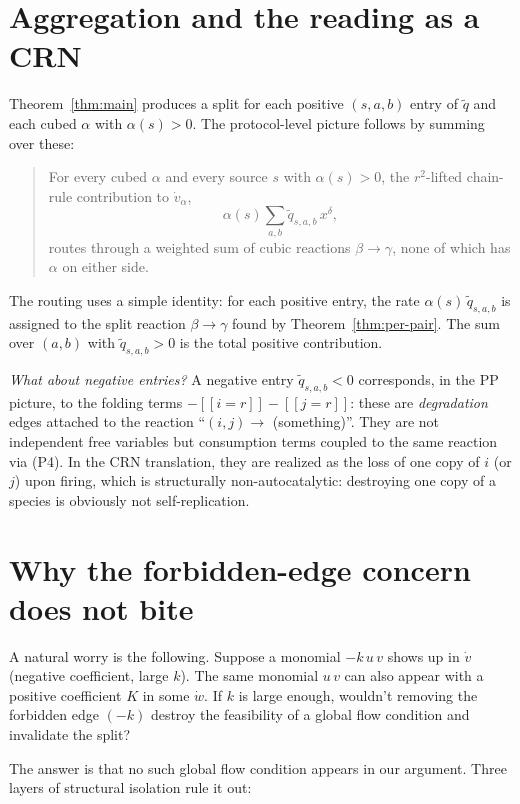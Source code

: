 \documentclass[11pt]{article}
\newcommand{\iv}[1]{[\![#1]\!]}
\begin{document}
\section{Aggregation and the reading as a CRN}

Theorem~\ref{thm:main} produces a split for each positive $(s,a,b)$
entry of $\widetilde q$ and each cubed $\alpha$ with $\alpha(s) > 0$.
The protocol-level picture follows by summing over these:

\begin{quote}
For every cubed $\alpha$ and every source $s$ with $\alpha(s) > 0$,
the $r^2$-lifted chain-rule contribution to $\dot v_\alpha$,
\[
   \alpha(s) \sum_{a,b} \widetilde q_{s,a,b}\, x^\delta,
\]
routes through a weighted sum of cubic reactions $\beta \to \gamma$,
none of which has $\alpha$ on either side.
\end{quote}

The routing uses a simple identity: for each positive entry, the rate
$\alpha(s)\,\widetilde q_{s,a,b}$ is assigned to the split reaction
$\beta \to \gamma$ found by Theorem~\ref{thm:per-pair}. The sum over
$(a,b)$ with $\widetilde q_{s,a,b} > 0$ is the total positive
contribution.

\emph{What about negative entries?} A negative entry
$\widetilde q_{s,a,b} < 0$ corresponds, in the PP picture, to the
folding terms $-\iv{i=r} - \iv{j=r}$: these are \emph{degradation}
edges attached to the reaction ``$(i,j) \to$ (something)''. They are not
independent free variables but consumption terms coupled to the same
reaction via (P4). In the CRN translation, they are realized as the
loss of one copy of $i$ (or $j$) upon firing, which is structurally
non-autocatalytic: destroying one copy of a species is obviously not
self-replication.

\section{Why the forbidden-edge concern does not bite}
\label{sec:forbidden}

A natural worry is the following. Suppose a monomial $-k\, u\, v$ shows
up in $\dot v$ (negative coefficient, large $k$). The same monomial
$u\, v$ can also appear with a positive coefficient $K$ in some
$\dot w$. If $k$ is large enough, wouldn't removing the forbidden edge
$(-k)$ destroy the feasibility of a global flow condition and invalidate
the split?

The answer is that no such global flow condition appears in our
argument. Three layers of structural isolation rule it out:
\end{document}
